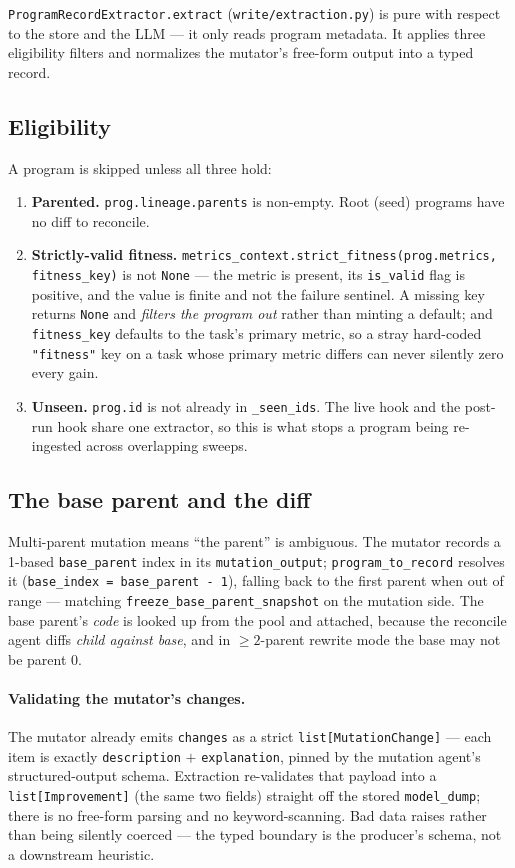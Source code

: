 \documentclass[11pt]{article}
\newcommand{\code}[1]{\texttt{\small #1}}
\begin{document}
\code{ProgramRecordExtractor.extract} (\code{write/extraction.py}) is pure with
respect to the store and the LLM --- it only reads program metadata. It applies
three eligibility filters and normalizes the mutator's free-form output into a
typed record.

\subsection{Eligibility}

A program is skipped unless all three hold:
\begin{enumerate}[leftmargin=1.6em, itemsep=1pt]
  \item \textbf{Parented.} \code{prog.lineage.parents} is non-empty. Root
    (seed) programs have no diff to reconcile.
  \item \textbf{Strictly-valid fitness.}
    \code{metrics\_context.strict\_fitness(prog.metrics, fitness\_key)} is not
    \code{None} --- the metric is present, its \code{is\_valid} flag is
    positive, and the value is finite and not the failure sentinel. A missing
    key returns \code{None} and \emph{filters the program out} rather than minting
    a default; and \code{fitness\_key} defaults to the task's primary metric, so a
    stray hard-coded \code{"fitness"} key on a task whose primary metric differs
    can never silently zero every gain.
  \item \textbf{Unseen.} \code{prog.id} is not already in \code{\_seen\_ids}. The
    live hook and the post-run hook share one extractor, so this is what stops a
    program being re-ingested across overlapping sweeps.
\end{enumerate}

\subsection{The base parent and the diff}

Multi-parent mutation means ``the parent'' is ambiguous. The mutator records a
1-based \code{base\_parent} index in its \code{mutation\_output}; \code{program\_to\_record}
resolves it (\code{base\_index = base\_parent - 1}), falling back to the first
parent when out of range --- matching \code{freeze\_base\_parent\_snapshot} on
the mutation side. The base parent's \emph{code} is looked up from the pool and
attached, because the reconcile agent diffs \emph{child against base}, and in
$\ge 2$-parent rewrite mode the base may not be parent 0.

\paragraph{Validating the mutator's changes.} The mutator already emits
\code{changes} as a strict \code{list[MutationChange]} --- each item is exactly
\code{description} $+$ \code{explanation}, pinned by the mutation agent's
structured-output schema. Extraction re-validates that payload into a
\code{list[Improvement]} (the same two fields) straight off the stored
\code{model\_dump}; there is no free-form parsing and no keyword-scanning. Bad
data raises rather than being silently coerced --- the typed boundary is the
producer's schema, not a downstream heuristic.
\end{document}
